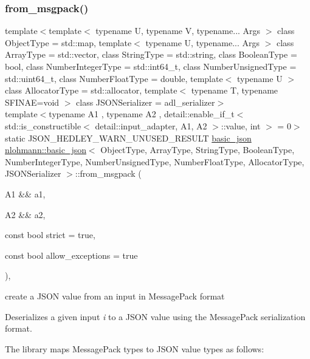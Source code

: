\subsubsection{\texorpdfstring{from\+\_\+msgpack()}{from\_msgpack()}\hspace{0.1cm}{\footnotesize\ttfamily [2/2]}}
{\footnotesize\ttfamily template$<$template$<$ typename U, typename V, typename... Args $>$ class Object\+Type = std\+::map, template$<$ typename U, typename... Args $>$ class Array\+Type = std\+::vector, class String\+Type  = std\+::string, class Boolean\+Type  = bool, class Number\+Integer\+Type  = std\+::int64\+\_\+t, class Number\+Unsigned\+Type  = std\+::uint64\+\_\+t, class Number\+Float\+Type  = double, template$<$ typename U $>$ class Allocator\+Type = std\+::allocator, template$<$ typename T, typename S\+F\+I\+N\+A\+E=void $>$ class J\+S\+O\+N\+Serializer = adl\+\_\+serializer$>$ \\
template$<$typename A1 , typename A2 , detail\+::enable\+\_\+if\+\_\+t$<$ std\+::is\+\_\+constructible$<$ detail\+::input\+\_\+adapter, A1, A2 $>$\+::value, int $>$  = 0$>$ \\
static J\+S\+O\+N\+\_\+\+H\+E\+D\+L\+E\+Y\+\_\+\+W\+A\+R\+N\+\_\+\+U\+N\+U\+S\+E\+D\+\_\+\+R\+E\+S\+U\+LT \mbox{\hyperlink{classnlohmann_1_1basic__json}{basic\+\_\+json}} \mbox{\hyperlink{classnlohmann_1_1basic__json}{nlohmann\+::basic\+\_\+json}}$<$ Object\+Type, Array\+Type, String\+Type, Boolean\+Type, Number\+Integer\+Type, Number\+Unsigned\+Type, Number\+Float\+Type, Allocator\+Type, J\+S\+O\+N\+Serializer $>$\+::from\+\_\+msgpack (\begin{DoxyParamCaption}\item[{A1 \&\&}]{a1,  }\item[{A2 \&\&}]{a2,  }\item[{const bool}]{strict = {\ttfamily true},  }\item[{const bool}]{allow\+\_\+exceptions = {\ttfamily true} }\end{DoxyParamCaption})\hspace{0.3cm}{\ttfamily [inline]}, {\ttfamily [static]}}



create a J\+S\+ON value from an input in Message\+Pack format 

Deserializes a given input {\itshape i} to a J\+S\+ON value using the Message\+Pack serialization format.

The library maps Message\+Pack types to J\+S\+ON value types as follows\+:

